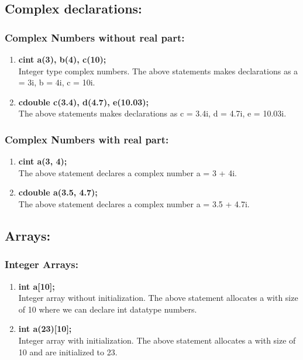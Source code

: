 \documentclass[12pt]{article}
\begin{document}
\subsection{Complex declarations:}
\subsubsection{Complex Numbers without real part:}
\begin{enumerate}
    \item \textbf{cint a(3), b(4), c(10);}\\
Integer type complex numbers.
The above statements makes declarations as a = 3i, b = 4i, c = 10i.
    \item \textbf{cdouble c(3.4), d(4.7), e(10.03);} \\
The above statements makes declarations as c = 3.4i, d = 4.7i, e = 10.03i.
\end{enumerate}

\subsubsection{Complex Numbers with real part:}
\begin{enumerate}
    \item \textbf{cint a(3, 4);}\\
The above statement declares a complex number a = 3 + 4i.
    \item \textbf{cdouble a(3.5, 4.7);}\\
The above statement declares a complex number a = 3.5 + 4.7i.
\end{enumerate}
\subsection{Arrays:}
\subsubsection{Integer Arrays:} 
\begin{enumerate}
    \item \textbf{int a[10];}\\
Integer array without initialization.
The above statement allocates a with size of 10 where we can declare int datatype numbers.
\item \textbf{int a(23)[10];} \\
Integer array with initialization.
The above statement allocates a with size of 10 and are initialized to 23.
\end{enumerate}
\end{document}
